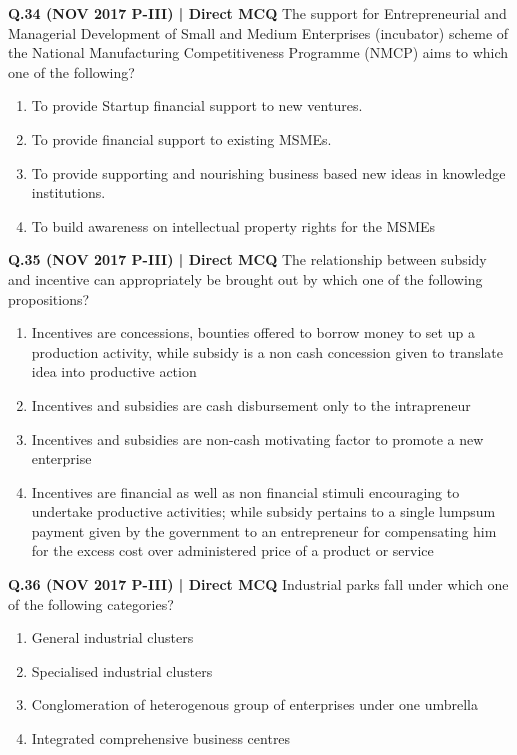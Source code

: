 \documentclass{article}
\begin{document}
\textbf{Q.34 (NOV 2017 P-III) | Direct MCQ}
The support for Entrepreneurial and Managerial Development of Small and Medium Enterprises (incubator) scheme of the National Manufacturing Competitiveness Programme (NMCP) aims to which one of the following?
\begin{enumerate}[label=(\arabic*)]
    \item To provide Startup financial support to new ventures.
    \item To provide financial support to existing MSMEs.
    \item To provide supporting and nourishing business based new ideas in knowledge institutions.
    \item To build awareness on intellectual property rights for the MSMEs
\end{enumerate}

\textbf{Q.35 (NOV 2017 P-III) | Direct MCQ}
The relationship between subsidy and incentive can appropriately be brought out by which one of the following propositions?
\begin{enumerate}[label=(\arabic*)]
    \item Incentives are concessions, bounties offered to borrow money to set up a production activity, while subsidy is a non cash concession given to translate idea into productive action
    \item Incentives and subsidies are cash disbursement only to the intrapreneur
    \item Incentives and subsidies are non-cash motivating factor to promote a new enterprise
    \item Incentives are financial as well as non financial stimuli encouraging to undertake productive activities; while subsidy pertains to a single lumpsum payment given by the government to an entrepreneur for compensating him for the excess cost over administered price of a product or service
\end{enumerate}

\textbf{Q.36 (NOV 2017 P-III) | Direct MCQ}
Industrial parks fall under which one of the following categories?
\begin{enumerate}[label=(\arabic*)]
    \item General industrial clusters
    \item Specialised industrial clusters
    \item Conglomeration of heterogenous group of enterprises under one umbrella
    \item Integrated comprehensive business centres
\end{enumerate}
\end{document}
